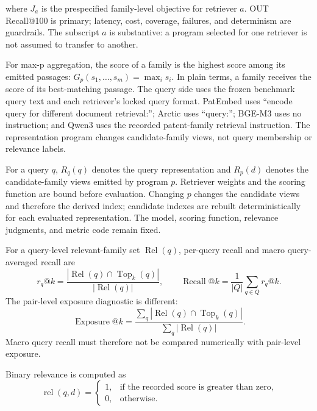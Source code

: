 \documentclass[final,5p,times,twocolumn]{elsarticle}
\begin{document}
where \(J_a\) is the prespecified family-level objective for retriever \(a\). OUT
Recall@100 is primary; latency, cost, coverage, failures, and determinism are
guardrails. The subscript \(a\) is substantive: a program selected for one
retriever is not assumed to transfer to another.

For max-p aggregation, the score of a family is the highest score among its
emitted passages: \(G_p(s_1,\ldots,s_m)=\max_i s_i\). In plain terms, a
family receives the score of its best-matching passage. The query side uses
the frozen benchmark query text and each retriever's locked query format.
PatEmbed uses ``encode query for different document retrieval:''; Arctic uses
``query:''; BGE-M3 uses no instruction; and Qwen3 uses the recorded
patent-family retrieval instruction. The representation program changes
candidate-family views, not query membership or relevance labels.

For a query \(q\), \(R_q(q)\) denotes the query representation and \(R_p(d)\)
denotes the candidate-family views emitted by program \(p\). Retriever weights
and the scoring function are bound before evaluation. Changing \(p\) changes
the candidate views and therefore the derived index; candidate indexes are
rebuilt deterministically for each evaluated representation. The model,
scoring function, relevance judgments, and metric code remain fixed.

For a query-level relevant-family set \(\operatorname{Rel}(q)\), per-query
recall and macro query-averaged recall are
\begin{equation}
 r_q@k=\frac{|\operatorname{Rel}(q)\cap\operatorname{Top}_k(q)|}
 {|\operatorname{Rel}(q)|},\qquad
 \operatorname{Recall}@k=\frac{1}{|Q|}\sum_{q\in Q}r_q@k .
\end{equation}
The pair-level exposure diagnostic is different:
\begin{equation}
 \operatorname{Exposure}@k=\frac{\sum_q|\operatorname{Rel}(q)\cap
 \operatorname{Top}_k(q)|}{\sum_q|\operatorname{Rel}(q)|}.
\end{equation}
Macro query recall must therefore not be compared numerically with pair-level
exposure.

Binary relevance is computed as
\begin{equation}
 \operatorname{rel}(q,d)=
 \begin{cases}
  1, & \text{if the recorded score is greater than zero},\\
  0, & \text{otherwise}.
 \end{cases}
\end{equation}
\end{document}
